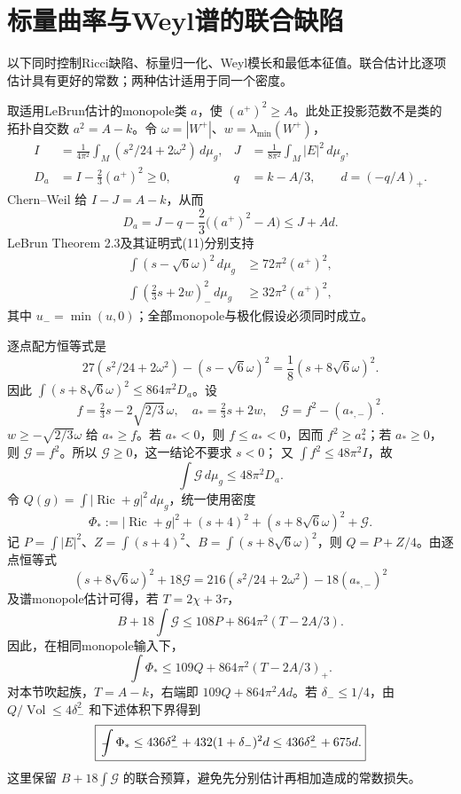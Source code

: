 \documentclass[UTF8,a4paper,11pt,fontset=fandol]{ctexart}
\numberwithin{equation}{section}
\theoremstyle{definition}
\newcommand{\Ric}{\operatorname{Ric}}
\newcommand{\Vol}{\operatorname{Vol}}
\newcommand{\dd}{\,d\mu_g}
\newcommand{\fint}{\mathop{\rlap{\,\raisebox{0.1ex}{\tiny$-$}}\int}\nolimits}
\begin{document}
\section{标量曲率与Weyl谱的联合缺陷}
以下同时控制Ricci缺陷、标量归一化、Weyl模长和最低本征值。联合估计比逐项估计具有更好的常数；两种估计适用于同一个密度。

取适用LeBrun估计的monopole类 $a$，使 $(a^+)^2\ge A$。此处正投影范数不是类的拓扑自交数 $a^2=A-k$。令 $\omega=|W^+|$、$w=\lambda_{\min}(W^+)$，
\begin{align}
 I&=\frac1{4\pi^2}\int_M(s^2/24+2\omega^2)\dd,
 &J&=\frac1{8\pi^2}\int_M|E|^2\dd,\\
 D_a&=I-\frac23(a^+)^2\ge0,
 &q&=k-A/3,\qquad d=(-q/A)_+.
\end{align}
Chern--Weil 给 $I-J=A-k$，从而
\begin{equation}\label{eq:Da}
D_a=J-q-\frac23\big((a^+)^2-A\big)\le J+Ad.
\end{equation}
LeBrun Theorem 2.3及其证明式(11)分别支持
\begin{align}
\int(s-\sqrt6\omega)^2\dd&\ge72\pi^2(a^+)^2,\\
\int\left(\frac23s+2w\right)_{-}^{\!2}\dd&\ge32\pi^2(a^+)^2,
\end{align}
其中 $u_-=\min(u,0)$；全部monopole与极化假设必须同时成立\cite{LeBrun2001}。

逐点配方恒等式是
\begin{equation}\label{eq:square}
27(s^2/24+2\omega^2)-(s-\sqrt6\omega)^2
=\frac18(s+8\sqrt6\omega)^2.
\end{equation}
因此 $\int(s+8\sqrt6\omega)^2\le864\pi^2D_a$。设
\[
f=\tfrac23s-2\sqrt{2/3}\,\omega,\quad a_*=\tfrac23s+2w,
\quad\mathcal G=f^2-(a_{*,-})^2.
\]
$w\ge-\sqrt{2/3}\omega$ 给 $a_*\ge f$。若 $a_*<0$，则
$f\le a_*<0$，因而 $f^2\ge a_*^2$；若 $a_*\ge0$，则
$\mathcal G=f^2$。所以 $\mathcal G\ge0$，这一结论不要求 $s<0$；
又 $\int f^2\le48\pi^2I$，故
\begin{equation}
\int\mathcal G\dd\le48\pi^2D_a.
\end{equation}
令 $Q(g)=\int|\Ric+g|^2\dd$，统一使用密度
\begin{equation}\label{eq:Phistar}
\Phi_*:=|\Ric+g|^2+(s+4)^2+(s+8\sqrt6\omega)^2+\mathcal G.
\end{equation}
记 $P=\int|E|^2$、$Z=\int(s+4)^2$、$B=\int(s+8\sqrt6\omega)^2$，则 $Q=P+Z/4$。由逐点恒等式
\begin{equation}\label{eq:joint-density-identity}
(s+8\sqrt6\omega)^2+18\mathcal G
=216(s^2/24+2\omega^2)-18(a_{*,-})^2
\end{equation}
及谱monopole估计可得，若 $T=2\chi+3\tau$，
\[
B+18\int\mathcal G\le108P+864\pi^2(T-2A/3).
\]
因此，在相同monopole输入下，
\begin{equation}\label{eq:109}
\boxed{\int\Phi_*\le109Q+864\pi^2(T-2A/3)_+.}
\end{equation}
对本节吹起族，$T=A-k$，右端即 $109Q+864\pi^2Ad$。若 $\delta_-\le1/4$，由 $Q/\Vol\le4\delta_-^2$ 和下述体积下界得到
\begin{equation}\label{eq:436675}
\boxed{\fint\Phi_*\le436\delta_-^2+432(1+\delta_-)^2d
\le436\delta_-^2+675d.}
\end{equation}
这里保留 $B+18\int\mathcal G$ 的联合预算，避免先分别估计再相加造成的常数损失。
\end{document}
